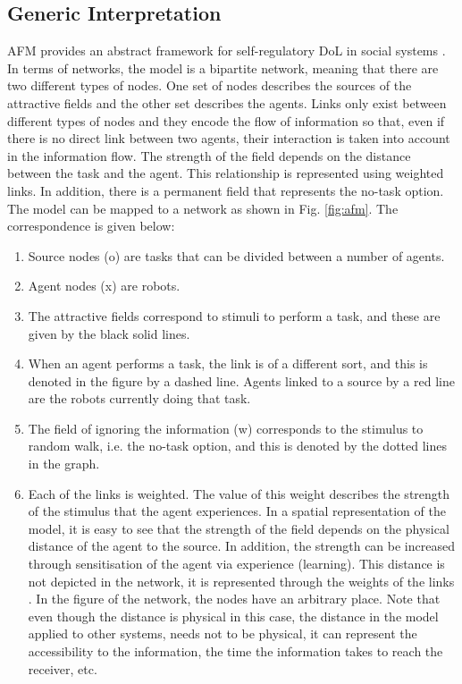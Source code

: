 \subsection{Generic Interpretation}
AFM provides an abstract framework for self-regulatory DoL in social systems \cite{Elsa}. In terms of networks, the model is a bipartite network, meaning that there are two different types of nodes. One set of nodes describes the sources of the attractive fields and the other set describes the agents. Links only exist between different types of nodes and they encode the flow of information so that, even if there is no direct link between two agents, their interaction is taken into account in the information flow. The strength of the field depends on the distance between the task and the agent.  This relationship is represented using weighted links. In addition, there is a permanent field that represents the no-task option. The model can be mapped to a network as shown in Fig. \ref{fig:afm}. The correspondence is given below:
\begin{enumerate}
\item Source nodes (o) are tasks that can be divided between a number of agents.
\item Agent nodes (x) are robots.
\item The attractive fields correspond to stimuli to perform a task, and these are given by the black solid lines.
\item When an agent performs a task, the link is of a different sort, and this is denoted in the figure by a dashed line. Agents linked to a source by a red line are the robots currently doing that task. 
\item The field of ignoring the information (w) corresponds to the stimulus to random walk, i.e. the no-task option, and this is denoted by the dotted lines in the graph. 
\item Each of the links is weighted. The value of this weight describes the strength of the stimulus that the agent experiences. In a spatial representation of the model, it is easy to see that the strength of the field depends on the physical distance of the agent to the source. In addition, the strength can be increased through sensitisation of the agent via experience (learning). This distance is not depicted in the network, it is represented through the weights of the links . In the figure of the network, the nodes have an arbitrary place. Note that even though the distance is physical in this case, the distance in the model applied to other systems, needs not to be physical, it can represent the accessibility to the information, the time the information takes to reach the receiver, etc. 
\end{enumerate}
